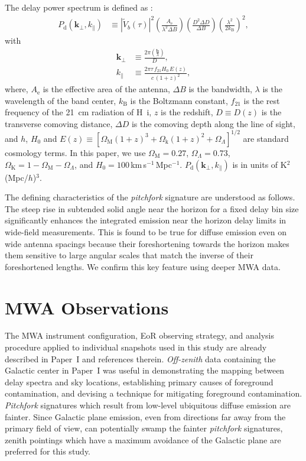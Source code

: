 \documentclass[preprint2,apjl,numberedappendix,twocolappendix,appendixfloats]{emulateapj}
\begin{document}
The delay power spectrum is defined as \citep[][Paper~I]{par12a}:
\begin{align}\label{eqn:delay-power-spectrum}
  P_\textrm{d}(\boldsymbol{k}_\perp,k_\parallel) &\equiv |\widetilde{V}_b(\tau)|^2\left(\frac{A_\textrm{e}}{\lambda^2\Delta B}\right)\left(\frac{D^2\Delta D}{\Delta B}\right)\left(\frac{\lambda^2}{2k_\textrm{B}}\right)^2,
\end{align}
with
\begin{align}
  \boldsymbol{k}_\perp &\equiv \frac{2\pi(\frac{\boldsymbol{b}}{\lambda})}{D}, \\
  k_\parallel &\equiv \frac{2\pi\tau\,f_{21}H_0\,E(z)}{c\,(1+z)^2}, 
\end{align}
where, $A_\textrm{e}$ is the effective area of the antenna, $\Delta B$ is the bandwidth, $\lambda$ is the wavelength of the band center, $k_\textrm{B}$ is the Boltzmann constant, $f_{21}$ is the rest frequency of the 21~cm radiation of H~{\sc i}, $z$ is the redshift, $D\equiv D(z)$ is the transverse comoving distance, $\Delta D$ is the comoving depth along the line of sight, and $h$, $H_0$ and $E(z)\equiv [\Omega_\textrm{M}(1+z)^3+\Omega_\textrm{k}(1+z)^2+\Omega_\Lambda]^{1/2}$ are standard cosmology terms. In this paper, we use $\Omega_\textrm{M}=0.27$, $\Omega_\Lambda=0.73$, $\Omega_\textrm{K}=1-\Omega_\textrm{M}-\Omega_\Lambda$, and $H_0=100\,$km$\,$s$^{-1}\,$Mpc$^{-1}$. $P_\textrm{d}(\boldsymbol{k}_\perp,k_\parallel)$ is in units of K$^2$(Mpc/$h$)$^3$.

The defining characteristics of the {\it pitchfork} signature are understood as follows. The steep rise in subtended solid angle near the horizon for a fixed delay bin size significantly enhances the integrated emission near the horizon delay limits in wide-field measurements. This is found to be true for diffuse emission even on wide antenna spacings because their foreshortening towards the horizon makes them sensitive to large angular scales that match the inverse of their foreshortened lengths. We confirm this key feature using deeper MWA data.

\section{MWA Observations}\label{sec:MWA}

The MWA instrument configuration, EoR observing strategy, and analysis procedure applied to individual snapshots used in this study are already described in Paper~I and references therein. {\it Off-zenith} data containing the Galactic center in Paper~I was useful in demonstrating the mapping between delay spectra and sky locations, establishing primary causes of foreground contamination, and devising a technique for mitigating foreground contamination. {\it Pitchfork} signatures which result from low-level ubiquitous diffuse emission are fainter. Since Galactic plane emission, even from directions far away from the primary field of view, can potentially swamp the fainter {\it pitchfork} signatures, zenith pointings which have a maximum avoidance of the Galactic plane are preferred for this study.
\end{document}
